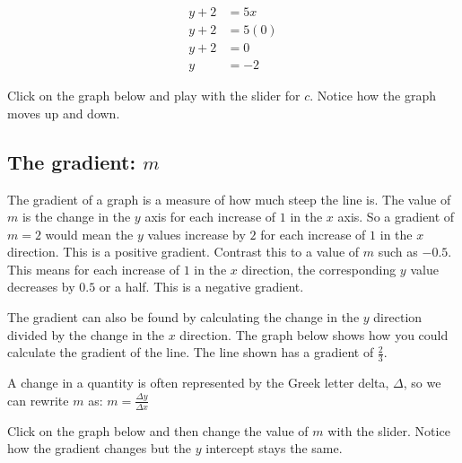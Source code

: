 \documentclass[
  a4paper,
]{scrbook}
\begin{document}
\[
\begin{aligned}
y +2 &= 5x \\
 y+2 &= 5(0) \\
 y +2 &= 0 \\
 y &= -2
\end{aligned}
\]

Click on the graph below and play with the slider for \(c\). Notice how
the graph moves up and down.

\subsection{\texorpdfstring{The gradient:
\(m\)}{The gradient: m}}\label{the-gradient-m}

The gradient of a graph is a measure of how much steep the line is. The
value of \(m\) is the change in the \(y\) axis for each increase of
\(1\) in the \(x\) axis. So a gradient of \(m=2\) would mean the \(y\)
values increase by \(2\) for each increase of \(1\) in the \(x\)
direction. This is a positive gradient. Contrast this to a value of
\(m\) such as \(-0.5\). This means for each increase of \(1\) in the
\(x\) direction, the corresponding \(y\) value decreases by \(0.5\) or a
half. This is a negative gradient.

The gradient can also be found by calculating the change in the \(y\)
direction divided by the change in the \(x\) direction. The graph below
shows how you could calculate the gradient of the line. The line shown
has a gradient of \(\frac{2}{3}\).

\begin{tcolorbox}[enhanced jigsaw, arc=.35mm, bottomrule=.15mm, bottomtitle=1mm, breakable, colback=white, colbacktitle=quarto-callout-tip-color!10!white, colframe=quarto-callout-tip-color-frame, coltitle=black, left=2mm, leftrule=.75mm, opacityback=0, opacitybacktitle=0.6, rightrule=.15mm, title=\textcolor{quarto-callout-tip-color}{\faLightbulb}\hspace{0.5em}{Pro tip}, titlerule=0mm, toprule=.15mm, toptitle=1mm]

A change in a quantity is often represented by the Greek letter delta,
\(\Delta\), so we can rewrite \(m\) as:
\(m = \frac{\Delta y}{\Delta x}\)

\end{tcolorbox}

Click on the graph below and then change the value of \(m\) with the
slider. Notice how the gradient changes but the \(y\) intercept stays
the same.
\end{document}
